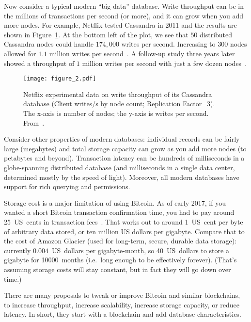 \documentclass[a4paper]{article}
\begin{document}
Now consider a typical modern ``big-data'' database.
Write throughput can be in the millions of transactions per second (or more),
and it can grow when you add more nodes.
For example, Netflix tested Cassandra in 2011 and the results
are shown in Figure~\ref{fig:cassandra_throughput}.
At the bottom left of the plot, we see that $50$ distributed Cassandra nodes could handle $174,000$ writes per second.
Increasing to $300$ nodes allowed for $1.1$ million writes per second~\cite{cockcroft2011benchmarking}.
A follow-up study three years later showed a throughput of $1$ million writes per second with just a few dozen nodes~\cite{kalantzis_netflix}.


\begin{figure}[!ht]
  \centering
  \texttt{[image: figure\_2.pdf]}
  \caption{Netflix experimental data on write throughput of its Cassandra database (Client writes/s by node count; Replication Factor=$3$).
  The x-axis is number of nodes; the y-axis is writes per second.
  From~\cite{cockcroft2011benchmarking}.}
  \label{fig:cassandra_throughput}
\end{figure}


Consider other properties of modern databases:
individual records can be fairly large (megabytes)
and total storage capacity can grow as you add more nodes
(to petabytes and beyond).
Transaction latency can be hundreds of milliseconds
in a globe-spanning distributed database
(and milliseconds in a single data center,
determined mostly by the speed of light).
Moreover, all modern databases have support
for rich querying and permissions.

Storage cost is a major limitation of using Bitcoin.
As of early 2017,
if you wanted a short Bitcoin transaction confirmation time,
you had to pay around 25~US~cents
in transaction fees~\cite{bitcoin_tx_fees_2017}.
That works out to around 1~US~cent
per byte of arbitrary data stored,
or ten million US dollars per gigabyte.
Compare that to the cost of Amazon Glacier (used
for long-term, secure, durable data storage):
currently $0.004$~US~dollars per gigabyte-month,
so 40~US~dollars to store a gigabyte for 10000~months
(i.e.~long enough to be effectively forever).
(That's assuming storage costs will stay constant,
but in fact they will go down over time.)

There are many proposals to tweak or improve Bitcoin and similar blockchains,
to increase throughput, increase scalability, increase storage capacity, or reduce latency.
In short, they start with a blockchain and add database characteristics.
\end{document}
